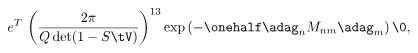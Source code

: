 \begin{equation} %
 e^T \, \left(\frac{2\pi}{Q \det (1-S\tV)} \right)^{13}  \exp \left(
         -\onehalf \adag_n  M_{nm} \adag_m \right) \0 ,
\end{equation} 

